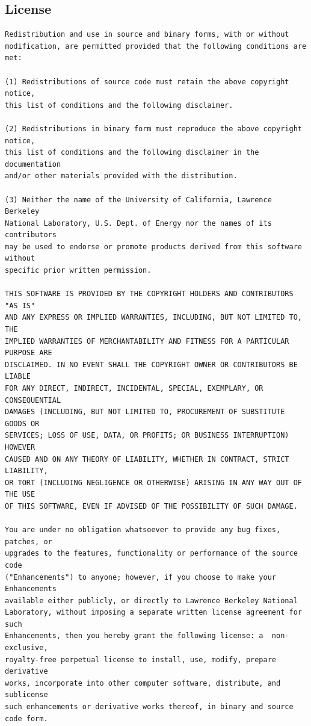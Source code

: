 \documentclass[a4paper]{article}
\begin{document}
\subsection{License}
\begin{lstlisting}[frame=single]
Redistribution and use in source and binary forms, with or without
modification, are permitted provided that the following conditions are met:
 
(1) Redistributions of source code must retain the above copyright notice,
this list of conditions and the following disclaimer.
 
(2) Redistributions in binary form must reproduce the above copyright notice,
this list of conditions and the following disclaimer in the documentation
and/or other materials provided with the distribution.
 
(3) Neither the name of the University of California, Lawrence Berkeley
National Laboratory, U.S. Dept. of Energy nor the names of its contributors
may be used to endorse or promote products derived from this software without
specific prior written permission.
 
THIS SOFTWARE IS PROVIDED BY THE COPYRIGHT HOLDERS AND CONTRIBUTORS "AS IS"
AND ANY EXPRESS OR IMPLIED WARRANTIES, INCLUDING, BUT NOT LIMITED TO, THE
IMPLIED WARRANTIES OF MERCHANTABILITY AND FITNESS FOR A PARTICULAR PURPOSE ARE
DISCLAIMED. IN NO EVENT SHALL THE COPYRIGHT OWNER OR CONTRIBUTORS BE LIABLE
FOR ANY DIRECT, INDIRECT, INCIDENTAL, SPECIAL, EXEMPLARY, OR CONSEQUENTIAL
DAMAGES (INCLUDING, BUT NOT LIMITED TO, PROCUREMENT OF SUBSTITUTE GOODS OR
SERVICES; LOSS OF USE, DATA, OR PROFITS; OR BUSINESS INTERRUPTION) HOWEVER
CAUSED AND ON ANY THEORY OF LIABILITY, WHETHER IN CONTRACT, STRICT LIABILITY,
OR TORT (INCLUDING NEGLIGENCE OR OTHERWISE) ARISING IN ANY WAY OUT OF THE USE
OF THIS SOFTWARE, EVEN IF ADVISED OF THE POSSIBILITY OF SUCH DAMAGE.

You are under no obligation whatsoever to provide any bug fixes, patches, or
upgrades to the features, functionality or performance of the source code
("Enhancements") to anyone; however, if you choose to make your Enhancements
available either publicly, or directly to Lawrence Berkeley National
Laboratory, without imposing a separate written license agreement for such
Enhancements, then you hereby grant the following license: a  non-exclusive,
royalty-free perpetual license to install, use, modify, prepare derivative
works, incorporate into other computer software, distribute, and sublicense
such enhancements or derivative works thereof, in binary and source code form.


\end{lstlisting}
\end{document}
